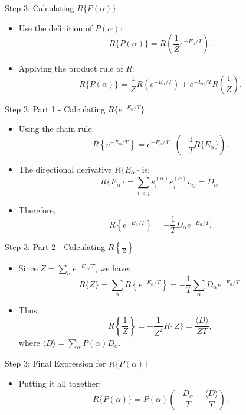 \documentclass{beamer}
\begin{document}
\begin{frame}{Step 3: Calculating \( R\{P(\alpha)\} \)}
    \begin{itemize}
        \item Use the definition of \( P(\alpha) \):
        \[
        R\{P(\alpha)\} = R\left(\frac{1}{Z} e^{-E_\alpha / T}\right).
        \]
        \item Applying the product rule of \( R \):
        \[
        R\{P(\alpha)\} = \frac{1}{Z} R\left(e^{-E_\alpha / T}\right) + e^{-E_\alpha / T} R\left(\frac{1}{Z}\right).
        \]
    \end{itemize}
\end{frame}

\begin{frame}{Step 3: Part 1 - Calculating \( R\{e^{-E_\alpha / T}\} \)}
    \begin{itemize}
        \item Using the chain rule:
        \[
        R\left\{ e^{-E_\alpha / T} \right\} = e^{-E_\alpha / T} \cdot \left(-\frac{1}{T} R\{E_\alpha\}\right).
        \]
        \item The directional derivative \( R\{E_\alpha\} \) is:
        \[
        R\{E_\alpha\} = \sum_{i<j} s_i^{(\alpha)} s_j^{(\alpha)} v_{ij} = D_\alpha.
        \]
        \item Therefore,
        \[
        R\left\{ e^{-E_\alpha / T} \right\} = -\frac{1}{T} D_\alpha e^{-E_\alpha / T}.
        \]
    \end{itemize}
\end{frame}

\begin{frame}{Step 3: Part 2 - Calculating \( R\left\{\frac{1}{Z}\right\} \)}
    \begin{itemize}
        \item Since \( Z = \sum_\alpha e^{-E_\alpha / T} \), we have:
        \[
        R\{Z\} = \sum_\alpha R\left\{ e^{-E_\alpha / T} \right\} = -\frac{1}{T} \sum_\alpha D_\alpha e^{-E_\alpha / T}.
        \]
        \item Thus,
        \[
        R\left\{\frac{1}{Z}\right\} = -\frac{1}{Z^2} R\{Z\} = \frac{\langle D \rangle}{Z T},
        \]
        where \( \langle D \rangle = \sum_\alpha P(\alpha) D_\alpha \).
    \end{itemize}
\end{frame}

\begin{frame}{Step 3: Final Expression for \( R\{P(\alpha)\} \)}
    \begin{itemize}
        \item Putting it all together:
        \[
        R\{P(\alpha)\} = P(\alpha) \left(-\frac{D_\alpha}{T} + \frac{\langle D \rangle}{T}\right).
        \]
    \end{itemize}
\end{frame}
\end{document}
